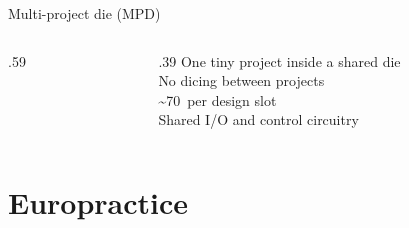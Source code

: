 \begin{frame}{Multi-project die (MPD)}
\begin{columns}[c,onlytextwidth]
\begin{column}{.59\textwidth}\centering{}\par\waferlegend\end{column}
\begin{column}{.39\textwidth}
{\Large\textcolor{NordPurple}{One tiny project inside a shared die}}\\[15pt]
{\large No dicing between projects}\\[18pt]
{\small \textasciitilde{}70\,\texteuro{} per design slot}\\[7pt]
{\small Shared I/O and control circuitry}
\end{column}
\end{columns}
\end{frame}

\section{Europractice}

